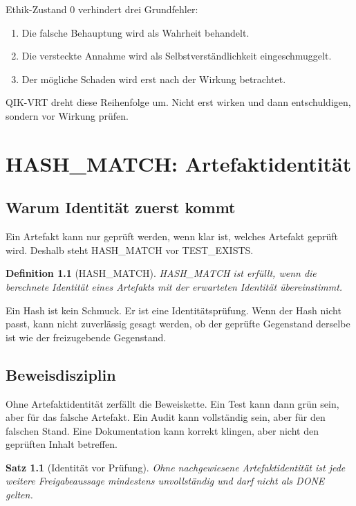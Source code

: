\documentclass[11pt,a4paper,oneside]{book}
\newtheorem{definition}{Definition}[chapter]
\newtheorem{satz}{Satz}[chapter]
\begin{document}
Ethik-Zustand 0 verhindert drei Grundfehler:

\begin{enumerate}
\item Die falsche Behauptung wird als Wahrheit behandelt.
\item Die versteckte Annahme wird als Selbstverständlichkeit eingeschmuggelt.
\item Der mögliche Schaden wird erst nach der Wirkung betrachtet.
\end{enumerate}

QIK-VRT dreht diese Reihenfolge um. Nicht erst wirken und dann entschuldigen, sondern vor Wirkung prüfen.

\chapter{HASH\_MATCH: Artefaktidentität}

\section{Warum Identität zuerst kommt}

Ein Artefakt kann nur geprüft werden, wenn klar ist, welches Artefakt geprüft wird. Deshalb steht HASH\_MATCH vor TEST\_EXISTS.

\begin{definition}[HASH\_MATCH]
HASH\_MATCH ist erfüllt, wenn die berechnete Identität eines Artefakts mit der erwarteten Identität übereinstimmt.
\end{definition}

Ein Hash ist kein Schmuck. Er ist eine Identitätsprüfung. Wenn der Hash nicht passt, kann nicht zuverlässig gesagt werden, ob der geprüfte Gegenstand derselbe ist wie der freizugebende Gegenstand.

\section{Beweisdisziplin}

Ohne Artefaktidentität zerfällt die Beweiskette. Ein Test kann dann grün sein, aber für das falsche Artefakt. Ein Audit kann vollständig sein, aber für den falschen Stand. Eine Dokumentation kann korrekt klingen, aber nicht den geprüften Inhalt betreffen.

\begin{satz}[Identität vor Prüfung]
Ohne nachgewiesene Artefaktidentität ist jede weitere Freigabeaussage mindestens unvollständig und darf nicht als DONE gelten.
\end{satz}
\end{document}

